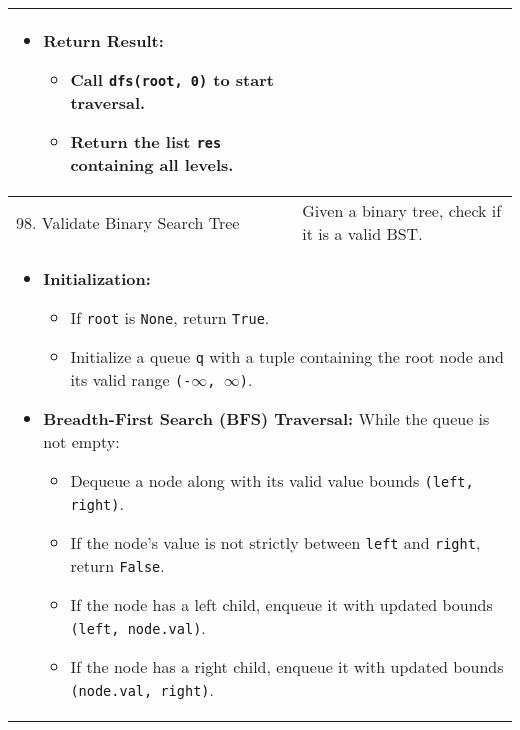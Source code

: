 \begin{summary}
\begin{center}
\begin{tabular}{ll}
{\begin{itemize}
                    \item \textbf{Return Result:}
                    \begin{itemize}
                        \item Call \texttt{dfs(root, 0)} to start traversal.
                        \item Return the list \texttt{res} containing all levels.
                    \end{itemize}
                \end{itemize}                
            } \\
            \midrule 
            98. Validate Binary Search Tree & Given a binary tree, check if it is a valid BST. \\
            \multicolumn{2}{p{\linewidth}}{
                \begin{itemize}
                    \item \textbf{Initialization:}
                    \begin{itemize}
                        \item If \texttt{root} is \texttt{None}, return \texttt{True}.
                        \item Initialize a queue \texttt{q} with a tuple containing the root node and its valid range \texttt{(-$\infty$, $\infty$)}.
                    \end{itemize}
                
                    \item \textbf{Breadth-First Search (BFS) Traversal:} While the queue is not empty:
                        \begin{itemize}
                            \item Dequeue a node along with its valid value bounds \texttt{(left, right)}.
                            \item If the node’s value is not strictly between \texttt{left} and \texttt{right}, return \texttt{False}.
                            \item If the node has a left child, enqueue it with updated bounds \texttt{(left, node.val)}.
                            \item If the node has a right child, enqueue it with updated bounds \texttt{(node.val, right)}.
                        \end{itemize}
                

\end{itemize}}
\end{tabular}
\end{center}
\end{summary}
